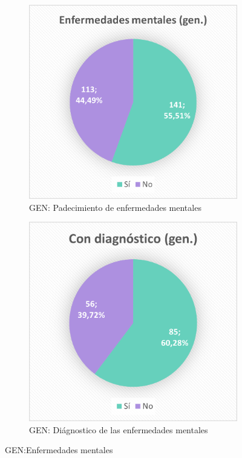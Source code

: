 \documentclass[12pt, a4paper,twoside,titlepage]{book}
\begin{document}
\begin{figure}
\centering
\begin{subfigure}{.5\textwidth}
  \centering
  \includegraphics[width=.95\linewidth]{Imagenes Form GEN/13GENEnfgen}
  \caption{GEN: Padecimiento de enfermedades mentales}
\end{subfigure}%
\begin{subfigure}{.5\textwidth}
  \centering
  \includegraphics[width=.95\linewidth]{Imagenes Form GEN/14GENDiag}
  \caption{GEN: Diágnostico de las enfermedades mentales}
\end{subfigure}
\caption{GEN:Enfermedades mentales}
\label{fig:Enfdiag}
\end{figure}
\end{document}
